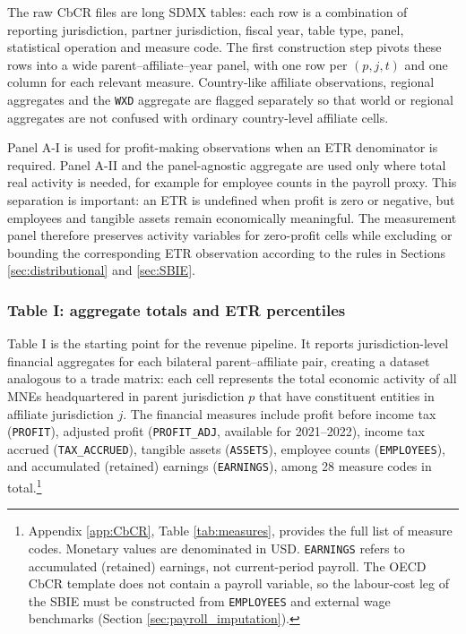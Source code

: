 \documentclass[11pt,a4paper]{article}
\newcommand{\code}[1]{\texttt{#1}}
\begin{document}
The raw CbCR files are long SDMX tables: each row is a combination of reporting jurisdiction, partner jurisdiction, fiscal year, table type, panel, statistical operation and measure code. The first construction step pivots these rows into a wide parent--affiliate--year panel, with one row per $(p,j,t)$ and one column for each relevant measure. Country-like affiliate observations, regional aggregates and the \code{WXD} aggregate are flagged separately so that world or regional aggregates are not confused with ordinary country-level affiliate cells.

Panel A-I is used for profit-making observations when an ETR denominator is required. Panel A-II and the panel-agnostic aggregate are used only where total real activity is needed, for example for employee counts in the payroll proxy. This separation is important: an ETR is undefined when profit is zero or negative, but employees and tangible assets remain economically meaningful. The measurement panel therefore preserves activity variables for zero-profit cells while excluding or bounding the corresponding ETR observation according to the rules in Sections \ref{sec:distributional} and \ref{sec:SBIE}.

\subsubsection{Table I: aggregate totals and ETR percentiles}\label{sec:t1_main}

Table I is the starting point for the revenue pipeline. It reports jurisdiction-level financial aggregates for each bilateral parent--affiliate pair, creating a dataset analogous to a trade matrix: each cell represents the total economic activity of all MNEs headquartered in parent jurisdiction $p$ that have constituent entities in affiliate jurisdiction $j$. The financial measures include profit before income tax (\code{PROFIT}), adjusted profit (\code{PROFIT\_ADJ}, available for 2021--2022), income tax accrued (\code{TAX\_ACCRUED}), tangible assets (\code{ASSETS}), employee counts (\code{EMPLOYEES}), and accumulated (retained) earnings (\code{EARNINGS}), among 28 measure codes in total.\footnote{Appendix \ref{app:CbCR}, Table \ref{tab:measures}, provides the full list of measure codes. Monetary values are denominated in USD. \code{EARNINGS} refers to accumulated (retained) earnings, not current-period payroll. The OECD CbCR template does not contain a payroll variable, so the labour-cost leg of the SBIE must be constructed from \code{EMPLOYEES} and external wage benchmarks (Section \ref{sec:payroll_imputation}).}
\end{document}

